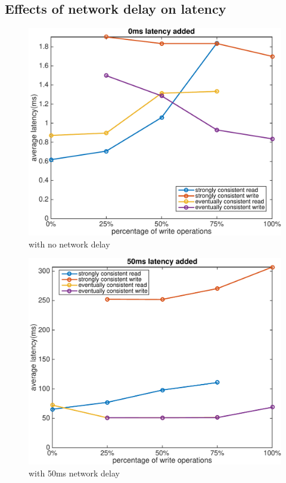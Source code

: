 \subsection{Effects of network delay on latency}
\begin{figure}[hbt]
\centering
\includegraphics[width=\linewidth]{figures/latency_0.pdf}
\caption{with no network delay}
\label{fig:latency_0}
\end{figure}

\begin{figure}[hbt]
\centering
\includegraphics[width=\linewidth]{figures/latency_50.pdf}
\caption{with 50ms network delay}
\label{fig:latency_50}
\end{figure}

